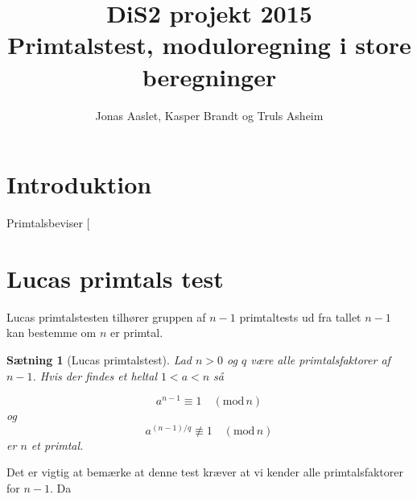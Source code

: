 \documentclass[a4paper]{article}
\title{DiS2 projekt 2015\\Primtalstest, moduloregning i store beregninger}
\author{Jonas Aaslet, Kasper Brandt og Truls Asheim}
\newtheorem{theorem}{Sætning}
\begin{document}
\begin{titlepage}
\maketitle
\end{titlepage}



\section{Introduktion}
Primtalsbeviser [

\section{Lucas primtals test}
Lucas primtalstesten tilhører gruppen af $n-1$ primtaltests ud fra
tallet $n-1$ kan bestemme om $n$ er primtal.

\begin{theorem}[Lucas primtalstest]
  Lad $n > 0$ og $q$ være alle primtalsfaktorer af $n - 1$. Hvis der
  findes et heltal $1 < a < n$ så

\begin{equation}
a^{n-1}\equiv 1 \quad (\text{mod}\,n)
\end{equation}
og
\begin{equation}
a^{(n-1)/q} \nequiv 1\quad (\text{mod}\,n)
\end{equation}
er $n$ et primtal.

\end{theorem}

Det er vigtig at bemærke at denne test kræver at vi kender alle
primtalsfaktorer for $n-1$. Da 
\end{document}
